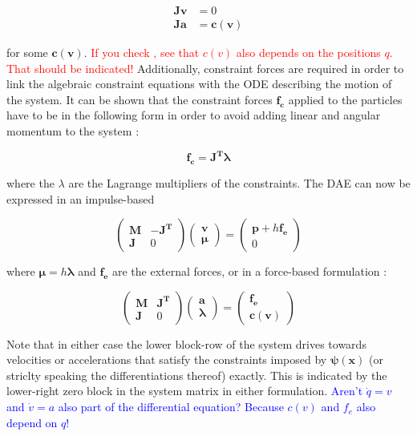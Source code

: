 \documentclass{article}
\begin{document}
\begin{align*}
    \bm{Jv} &= 0 \\
    \bm{Ja} &= \bm{c(v)}
\end{align*}

for some $\bm{c(v)}$. \textcolor{red}{If you check \cite{ascher1995}, see that $c(v)$ also depends on the positions $q$. That should be indicated!} 
Additionally, constraint forces are required in order to link the algebraic constraint equations with the ODE describing the motion of 
the system. It can be shown that the constraint forces $\bm{f_c}$ applied to the particles have to be in the following form in order to 
avoid adding linear and angular momentum to the system \cite{baraff1996}:

\[
    \bm{f_c} = \bm{J^T \lambda}
\]

where the $\lambda$ are the Lagrange multipliers of the constraints. The DAE can now be expressed in an impulse-based \cite{tournier2015}

\[
\begin{pmatrix}
    \bm{M} & \bm{-J^T} \\
    \bm{J} & 0
\end{pmatrix}
\begin{pmatrix}
    \bm{v} \\
    \bm{\mu}
\end{pmatrix}
=
\begin{pmatrix}
    \bm{p} + h\bm{f_e} \\
    0
\end{pmatrix}
\]

where $\bm{\mu} = h \bm{\lambda}$ and $\bm{f_e}$ are the external forces, or in a force-based formulation \cite{ascher1995}:

\[
\begin{pmatrix}
    \bm{M} & \bm{J^T} \\
    \bm{J} & 0
\end{pmatrix}
\begin{pmatrix}
    \bm{a} \\
    \bm{\lambda}
\end{pmatrix}
=
\begin{pmatrix}
    \bm{f_e} \\
    \bm{c(v)}
\end{pmatrix}
\]

Note that in either case the lower block-row of the system drives towards velocities or accelerations that satisfy the constraints 
imposed by $\bm{\psi(x)}$ (or striclty speaking the differentiations thereof) exactly. This is indicated by the lower-right zero
block in the system matrix in either formulation. \textcolor{blue}{Aren't $\dot{q} = v$ and $\dot{v} = a$ also part of the 
differential equation? Because $c(v)$ and $f_e$ also depend on $q$!}
\end{document}
